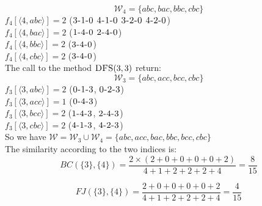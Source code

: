 		\begin{equation*}
		\mathcal{W}_{4} = \{ abc, bac, bbc, cbc \} 
		\end{equation*}
		$f_{4}[\langle 4, abc \rangle] = 2$ ($\textsc{3-1-0}$ $\textsc{4-1-0}$ $\textsc{3-2-0}$ $\textsc{4-2-0}$)\\
		$f_{4}[\langle 4, bac \rangle] = 2$ ($\textsc{1-4-0}$ $\textsc{2-4-0}$)\\
		$f_{4}[\langle 4, bbc \rangle] = 2$ ($\textsc{3-4-0}$)\\
		$f_{4}[\langle 4, cbc \rangle] = 2$ ($\textsc{3-4-0}$)\\
		
		The call to the method $\textsc{DFS}(3, 3)$ return:\\
		\begin{equation*}
		\mathcal{W}_{3} = \{ abc, acc, bcc, cbc \}
		\end{equation*}
		$f_{3}[\langle 3, abc \rangle] = 2$ ($\textsc{0-1-3}$, $\textsc{0-2-3}$)\\
		$f_{3}[\langle 3, acc \rangle] = 1$ ($\textsc{0-4-3}$)\\
		$f_{3}[\langle 3, bcc \rangle] = 2$ ($\textsc{1-4-3}$, $\textsc{2-4-3}$)\\
		$f_{3}[\langle 3, cbc \rangle] = 2$ ($\textsc{4-1-3}$, $\textsc{4-2-3}$)\\
		
		So we have $\mathcal{W} = \mathcal{W}_3 \cup \mathcal{W}_4 = \{ abc, acc, bac, bbc, bcc, cbc \}$\\
		
		The similarity according to the two indices is:
		\begin{equation*}
		BC(\{3\}, \{4\}) = \frac{2 \times ( 2 + 0 + 0 + 0 + 0 + 2 ) }{ 4 + 1 + 2 + 2 + 2 + 4 } = \frac{8}{15}
		\end{equation*}
		
		\begin{equation*}
		FJ(\{3\}, \{4\}) = \frac{ 2 + 0 + 0 + 0 + 0 + 2 }{ 4 + 1 + 2 + 2 + 2 + 4 } = \frac{4}{15}
		\end{equation*}
		
			
\clearpage

